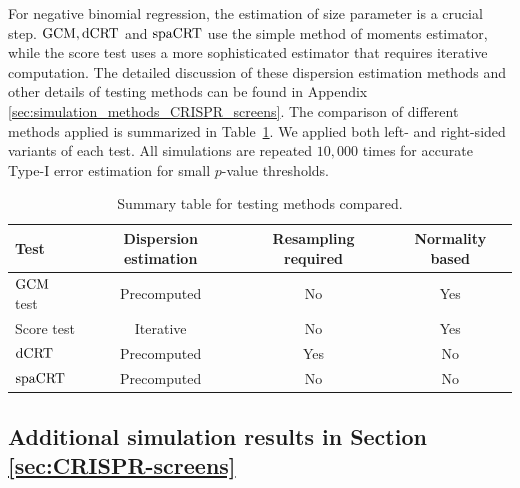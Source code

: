 \documentclass[12pt]{article}
\theoremstyle{definition}
\newcommand{\dCRT}{\textnormal{dCRT}} 					%
\newcommand{\GCM}{\textnormal{GCM}}						%
\newcommand{\spacrt}{\textnormal{spaCRT}}               %
\begin{document}
  For negative binomial regression, the estimation of size parameter is a crucial step. $\GCM,\dCRT$ and $\spacrt$ use the simple method of moments estimator, while the score test uses a more sophisticated estimator that requires iterative computation. The detailed discussion of these dispersion estimation methods and other details of testing methods can be found in Appendix \ref{sec:simulation_methods_CRISPR_screens}. The comparison of different methods applied is summarized in Table~\ref{tab:methodology_summary}. We applied both left- and right-sided variants of each test. All simulations are repeated $10,000$ times for accurate Type-I error estimation for small $p$-value thresholds. 

  \begin{table}[!h]
    \centering
    \begin{tabular}{l|c|c|c}
    Test & Dispersion estimation & Resampling required & Normality based \\
    \hline
    $\GCM$ test & Precomputed & No & Yes \\
    Score test & Iterative & No & Yes \\
    $\dCRT$ & Precomputed & Yes & No \\
    $\spacrt$ & Precomputed & No & No
    \end{tabular}
  \caption{Summary table for testing methods compared.}
  \label{tab:methodology_summary}
  \end{table}


\subsection{Additional simulation results in Section \ref{sec:CRISPR-screens}}\label{sec:additional_simulation_results_CRISPR}
  
\end{document}
